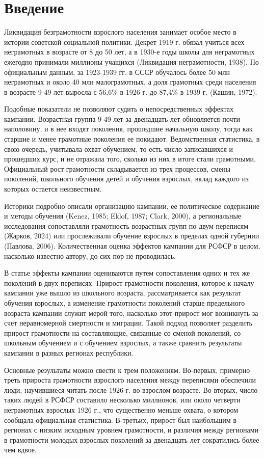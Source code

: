 \documentclass[12pt]{article}
\begin{document}
\section*{Введение}

Ликвидация безграмотности взрослого населения занимает особое место в истории советской социальной политики. Декрет 1919 г. обязал учиться всех неграмотных в возрасте от 8 до 50 лет, а в 1930-е годы школы для неграмотных ежегодно принимали миллионы учащихся (Ликвидация неграмотности, 1938). По официальным данным, за 1923-1939 гг. в СССР обучалось более 50 млн неграмотных и около 40 млн малограмотных, а доля грамотных среди населения в возрасте 9-49 лет выросла с 56,6\% в 1926 г. до 87,4\% в 1939 г. (Кашин, 1972).

Подобные показатели не позволяют судить о непосредственных эффектах кампании. Возрастная группа 9-49 лет за двенадцать лет обновляется почти наполовину, и в нее входят поколения, прошедшие начальную школу, тогда как старшие и менее грамотные поколения ее покидают. Ведомственная статистика, в свою очередь, учитывала охват обучением, то есть число записавшихся и прошедших курс, и не отражала того, сколько из них в итоге стали грамотными. Официальный рост грамотности складывается из трех процессов, смены поколений, школьного обучения детей и обучения взрослых, вклад каждого из которых остается неизвестным.

Историки подробно описали организацию кампании, ее политическое содержание и методы обучения (Kenez, 1985; Eklof, 1987; Clark, 2000), а региональные исследования сопоставляли грамотность возрастных групп по двум переписям (Жарков, 2024) или прослеживали обучение взрослых в пределах одной губернии (Павлова, 2006). Количественная оценка эффектов кампании для РСФСР в целом, насколько известно автору, до сих пор не проводилась.

В статье эффекты кампании оцениваются путем сопоставления одних и тех же поколений в двух переписях. Прирост грамотности поколения, которое к началу кампании уже вышло из школьного возраста, рассматривается как результат обучения взрослых, а изменение грамотности поколений старше предельного возраста кампании служит мерой того, насколько этот прирост мог возникнуть за счет неравномерной смертности и миграции. Такой подход позволяет разделить прирост грамотности на составляющие, связанные со сменой поколений, со школьным обучением и с обучением взрослых, а также сравнить результаты кампании в разных регионах республики.

Основные результаты можно свести к трем положениям. Во-первых, примерно треть прироста грамотности взрослого населения между переписями обеспечили люди, научившиеся читать после 1926 г. во взрослом возрасте. Во-вторых, число таких людей в РСФСР составило несколько миллионов, или около четверти неграмотных взрослых 1926 г., что существенно меньше охвата, о котором сообщала официальная статистика. В-третьих, прирост был наибольшим в регионах с низким исходным уровнем грамотности, и различия между регионами в грамотности молодых взрослых поколений за двенадцать лет сократились более чем вдвое.
\end{document}
